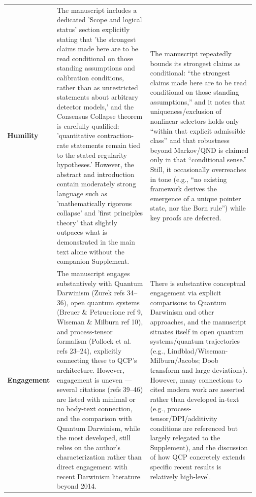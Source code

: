 \documentclass[11pt]{article}
\begin{document}
\begin{longtable}{@{} p{2.2cm} p{6.3cm} p{6.3cm} @{}}
\rowcolor{rowgray}
\textbf{Humility} &
The manuscript includes a dedicated 'Scope and logical status' section explicitly stating that 'the strongest claims made here are to be read conditional on those standing assumptions and calibration conditions, rather than as unrestricted statements about arbitrary detector models,' and the Consensus Collapse theorem is carefully qualified: 'quantitative contraction-rate statements remain tied to the stated regularity hypotheses.' However, the abstract and introduction contain moderately strong language such as 'mathematically rigorous collapse' and 'first principles theory' that slightly outpaces what is demonstrated in the main text alone without the companion Supplement. &
The manuscript repeatedly bounds its strongest claims as conditional: ``the strongest claims made here are to be read conditional on those standing assumptions,'' and it notes that uniqueness/exclusion of nonlinear selectors holds only ``within that explicit admissible class'' and that robustness beyond Markov/QND is claimed only in that ``conditional sense.'' Still, it occasionally overreaches in tone (e.g., ``no existing framework derives the emergence of a unique pointer state, nor the Born rule'') while key proofs are deferred. \\[6pt]

\textbf{Engagement} &
The manuscript engages substantively with Quantum Darwinism (Zurek refs 34--36), open quantum systems (Breuer \& Petruccione ref 9, Wiseman \& Milburn ref 10), and process-tensor formalism (Pollock et al. refs 23--24), explicitly connecting these to QCP's architecture. However, engagement is uneven --- several citations (refs 39--46) are listed with minimal or no body-text connection, and the comparison with Quantum Darwinism, while the most developed, still relies on the author's characterization rather than direct engagement with recent Darwinism literature beyond 2014. &
There is substantive conceptual engagement via explicit comparisons to Quantum Darwinism and other approaches, and the manuscript situates itself in open quantum systems/quantum trajectories (e.g., Lindblad/Wiseman-Milburn/Jacobs; Doob transform and large deviations). However, many connections to cited modern work are asserted rather than developed in-text (e.g., process-tensor/DPI/additivity conditions are referenced but largely relegated to the Supplement), and the discussion of how QCP concretely extends specific recent results is relatively high-level. \\[6pt]


\end{longtable}
\end{document}

